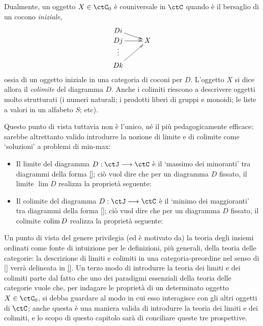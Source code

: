 Dualmente, un oggetto \(X\in\ctC_0\) è couniversale in \(\ctC\) quando è il bersaglio di un cocono \emph{iniziale},
\[\xymatrix@R=0mm{
	Di \ar@{->}[rd] &  \\
	Dj \ar@{->}[r] & X \\
	\vdots &  \\
	Dk \ar@{->}[ruu] &
	}\]
ossia di un oggetto iniziale in una categoria di coconi per \(D\). L'oggetto \(X\) si dice allora il \emph{colimite} del diagramma \(D\). Anche i colimiti riescono a descrivere oggetti molto strutturati (i numeri naturali; i prodotti liberi di gruppi e monoidi; le liste a valori in un alfabeto \(S\); etc).

Questo punto di vista tuttavia non è l'unico, né il più pedagogicamente efficace: sarebbe altrettanto valido introdurre la nozione di limite e di colimite come `soluzioni' a problemi di min-max:
\begin{itemize}
	\item Il limite del diagramma \(D : \ctJ\fun\ctC\) è il `massimo dei minoranti' tra diagrammi della forma \eqref{}; ciò vuol dire che per un diagramma \(D\) fissato, il limite \(\lim D\) realizza la proprietà seguente:
	      \Todo{}
	\item Il colimite del diagramma \(D : \ctJ\fun\ctC\) è il `minimo dei maggioranti' tra diagrammi della forma \eqref{}; ciò vuol dire che per un diagramma \(D\) fissato, il colimite \(\operatorname*{colim} D\) realizza la proprietà seguente:
	      \Todo{}
\end{itemize}
Un punto di vista del genere privilegia (ed è motivato da) la teoria degli insiemi ordinati come fonte di intuizione per le definizioni, più generali, della teoria delle categorie: la descrizione di limiti e colimiti in una categoria-preordine nel senso di \ref{} verrà delineata in \ref{}.
\Todo{}
Un terzo modo di introdurre la teoria dei limiti e dei colimiti parte dal fatto che uno dei paradigmi essenziali della teoria delle categorie vuole che, per indagare le proprietà di un determinato oggetto \(X\in\ctC_0\), si debba guardare al modo in cui esso interagisce con gli altri oggetti di \(\ctC\); anche questa è una maniera valida di introdurre la teoria dei limiti e dei colimiti, e lo scopo di questo capitolo sarà di conciliare queste tre prospettive.

